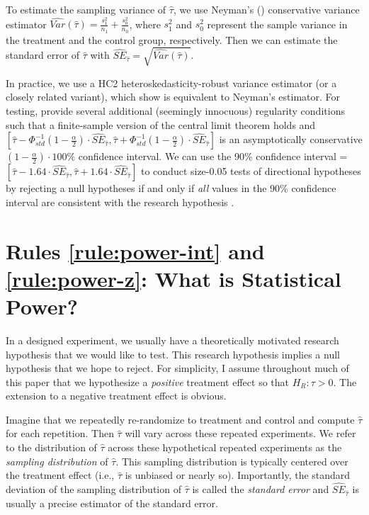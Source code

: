 \documentclass[12pt]{article}
\begin{document}
To estimate the sampling variance of $\widehat{\tau}$, we use Neyman's (\citeyear{Neyman1923}) conservative variance estimator $\widehat{Var}\left( \widehat{\tau} \right) = \frac{s_{1}^{2}}{n_{1}} + \frac{s_{0}^{2}}{n_{0}}$, where $s_{1}^{2}$ and $s_{0}^{2}$ represent the sample variance in the treatment and the control group, respectively. 
Then we can estimate the standard error of $\widehat{\tau}$ with ${\widehat{SE}}_{\widehat{\tau}} = \sqrt{\widehat{Var}\left( \widehat{\tau} \right)}$.

In practice, we use a HC2 heteroskedasticity-robust variance estimator (or a closely related variant), which \cite{Samii2012} show is equivalent to Neyman's estimator. 
For testing, \cite{Li2017} provide several additional (seemingly innocuous) regularity conditions such that a finite-sample version of the central limit theorem holds and $\left\lbrack \widehat{\tau} - \Phi_{std}^{- 1}\left( 1 - \frac{\alpha}{2} \right) \cdot {\widehat{SE}}_{\widehat{\tau}},\widehat{\tau} + \Phi_{std}^{- 1}\left( 1 - \frac{\alpha}{2} \right) \cdot {\widehat{SE}}_{\widehat{\tau}} \right\rbrack$ is an asymptotically conservative $\left( 1 - \frac{\alpha}{2} \right) \cdot 100\%$ confidence interval. 
We can use the 90\% confidence interval = $\left\lbrack \widehat{\tau} - 1.64 \cdot {\widehat{SE}}_{\widehat{\tau}},\widehat{\tau} + 1.64 \cdot {\widehat{SE}}_{\widehat{\tau}} \right\rbrack$ to conduct size-0.05 tests of directional hypotheses by rejecting a null hypotheses if and only if \emph{all} values in the 90\% confidence interval are consistent with the research hypothesis \citep{Rainey2014, McCaskey2015}.

\section*{Rules \ref{rule:power-int} and \ref{rule:power-z}: What is Statistical Power?}

In a designed experiment, we usually have a theoretically motivated research hypothesis that we would like to test. 
This research hypothesis implies a null hypothesis that we hope to reject. 
For simplicity, I assume throughout much of this paper that we hypothesize a \emph{positive} treatment effect so that $H_{R}:\tau > 0$. 
The extension to a negative treatment effect is obvious.

Imagine that we repeatedly re-randomize to treatment and control and compute $\widehat{\tau}$ for each repetition. 
Then $\widehat{\tau}$ will vary across these repeated experiments. 
We refer to the distribution of $\widehat{\tau}$ across these hypothetical
repeated experiments as the \emph{sampling distribution} of $\widehat{\tau}$. 
This sampling distribution is typically centered over the treatment effect (i.e., $\widehat{\tau}$ is unbiased or nearly so). 
Importantly, the standard deviation of the sampling distribution of $\widehat{\tau}$ is called the \emph{standard error} and ${\widehat{SE}}_{\widehat{\tau}}$ is usually a precise estimator of the standard error.
\end{document}

